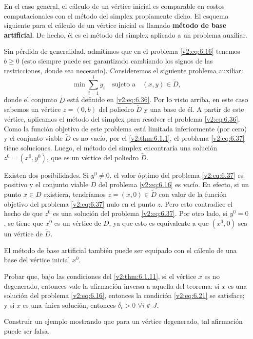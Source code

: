 En el caso general, el cálculo de un vértice inicial es comparable en costos computacionales con el método del simplex propiamente dicho. El esquema siguiente para el cálculo de un vértice inicial es llamado \textbf{método de base artificial}. De hecho, él es el método del simplex aplicado a un problema auxiliar.

Sin pérdida de generalidad, admitimos que en el problema \eqref{v2:eq:6.16} tenemos $b \ge 0$ (esto siempre puede ser garantizado cambiando los signos de las restricciones, donde sea necesario). Consideremos el siguiente problema auxiliar:
\begin{equation}
    \min \sum_{i=1}^l y_i \quad \text{sujeto a} \quad (x, y) \in \tilde{D},
    \label{v2:eq:6.37}
\end{equation}
donde el conjunto $\tilde{D}$ está definido en \eqref{v2:eq:6.36}. Por lo visto arriba, en este caso sabemos un vértice $z = (0, b)$ del poliedro $\tilde{D}$ y una base de él. A partir de este vértice, aplicamos el método del simplex para resolver el problema \eqref{v2:eq:6.36}. Como la función objetivo de este problema está limitada inferiormente (por cero) y el conjunto viable $\tilde{D}$ es no vacío, por el \cref{v2:thm:6.1.1}, el problema \eqref{v2:eq:6.37} tiene soluciones. Luego, el método del simplex encontraría una solución $z^0 = (x^0, y^0)$, que es un vértice del poliedro $\tilde{D}$.

Existen dos posibilidades. Si $y^0 \neq 0$, el valor óptimo del problema \eqref{v2:eq:6.37} es positivo y el conjunto viable $D$ del problema \eqref{v2:eq:6.16} es vacío. En efecto, si un punto $x \in D$ existiera, tendríamos $z = (x, 0) \in \tilde{D}$ con valor de la función objetivo del problema \eqref{v2:eq:6.37} nulo en el punto $z$. Pero esto contradice el hecho de que $z^0$ es una solución del problema \eqref{v2:eq:6.37}. Por otro lado, si $y^0 = 0$, se tiene que $x^0$ es un vértice de $D$, ya que esto es equivalente a que $(x^0, 0)$ sea un vértice de $\tilde{D}$.

El método de base artificial también puede ser equipado con el cálculo de una base del vértice inicial $x^0$.

\begin{exercise}\label{v2:ejer:6.1.18}
    Probar que, bajo las condiciones del \cref{v2:thm:6.1.11}, si el vértice $x$ es no degenerado, entonces vale la afirmación inversa a aquella del teorema: si $x$ es una solución del problema \eqref{v2:eq:6.16}, entonces la condición \eqref{v2:eq:6.21} se satisface; y si $x$ es una única solución, entonces $\delta_i > 0$ $\forall i \notin J$.
    
    Construir un ejemplo mostrando que para un vértice degenerado, tal afirmación puede ser falsa.
\end{exercise}